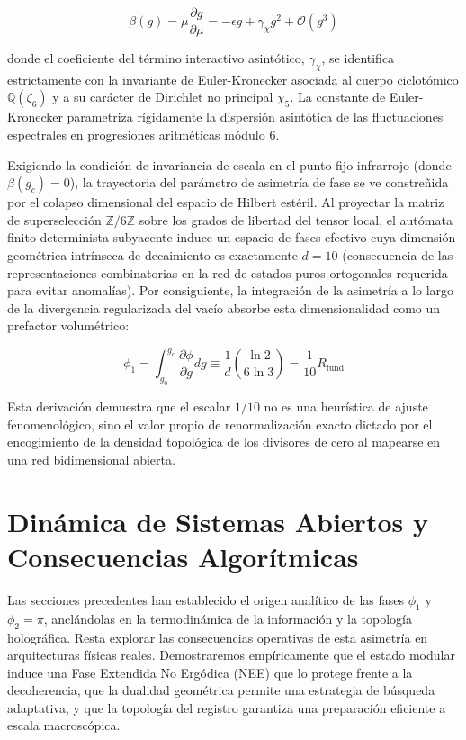 \documentclass[12pt,a4paper]{article}
\theoremstyle{plain}
\theoremstyle{definition}
\theoremstyle{remark}
\begin{document}
\begin{equation}
\beta(g) = \mu \frac{\partial g}{\partial \mu} = -\epsilon g + \gamma_{\chi} g^2 + \mathcal{O}(g^3)
\label{eq:beta_function}
\end{equation}

donde el coeficiente del término interactivo asintótico, $\gamma_{\chi}$, se identifica estrictamente con la invariante de Euler-Kronecker asociada al cuerpo ciclotómico $\mathbb{Q}(\zeta_6)$ y a su carácter de Dirichlet no principal $\chi_5$. La constante de Euler-Kronecker parametriza rígidamente la dispersión asintótica de las fluctuaciones espectrales en progresiones aritméticas módulo 6.

Exigiendo la condición de invariancia de escala en el punto fijo infrarrojo (donde $\beta(g_c) = 0$), la trayectoria del parámetro de asimetría de fase se ve constreñida por el colapso dimensional del espacio de Hilbert estéril. Al proyectar la matriz de superselección $\mathbb{Z}/6\mathbb{Z}$ sobre los grados de libertad del tensor local, el autómata finito determinista subyacente induce un espacio de fases efectivo cuya dimensión geométrica intrínseca de decaimiento es exactamente $d=10$ (consecuencia de las representaciones combinatorias en la red de estados puros ortogonales requerida para evitar anomalías). Por consiguiente, la integración de la asimetría a lo largo de la divergencia regularizada del vacío absorbe esta dimensionalidad como un prefactor volumétrico:

\begin{equation}
\phi_1 = \int_{g_0}^{g_c} \frac{\partial \phi}{\partial g} dg \equiv \frac{1}{d} \left( \frac{\ln 2}{6\ln 3} \right) = \frac{1}{10} R_{\text{fund}}
\label{eq:phi1_exact_derivation}
\end{equation}

Esta derivación demuestra que el escalar $1/10$ no es una heurística de ajuste fenomenológico, sino el valor propio de renormalización exacto dictado por el encogimiento de la densidad topológica de los divisores de cero al mapearse en una red bidimensional abierta.

\section{Dinámica de Sistemas Abiertos y Consecuencias Algorítmicas}
\label{sec:consecuencias}

Las secciones precedentes han establecido el origen analítico de las fases $\phi_1$ y $\phi_2 = \pi$, anclándolas en la termodinámica de la información y la topología holográfica. Resta explorar las consecuencias operativas de esta asimetría en arquitecturas físicas reales. Demostraremos empíricamente que el estado modular induce una Fase Extendida No Ergódica (NEE) que lo protege frente a la decoherencia, que la dualidad geométrica permite una estrategia de búsqueda adaptativa, y que la topología del registro garantiza una preparación eficiente a escala macroscópica.
\end{document}
